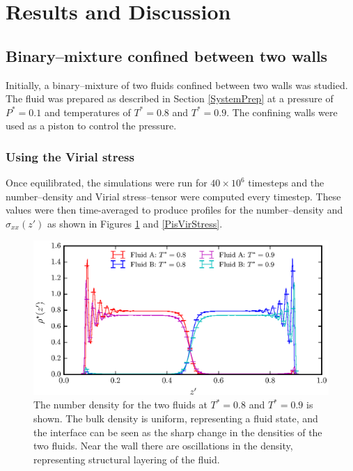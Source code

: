 \section{Results and Discussion}
\subsection{Binary--mixture confined between two walls}\label{Piston}
Initially, a binary--mixture of two fluids confined between two walls was studied. 
The fluid was prepared as described in Section \ref{SystemPrep} at a pressure of $P^{*} = 0.1$ and temperatures of $T^{*} = 0.8$ and $T^{*} = 0.9$.
The confining walls were used as a piston to control the pressure.

\subsubsection{Using the Virial stress}\label{VirialStressPiston}
Once equilibrated, the simulations were run for $40 \times 10^{6}$ timesteps and the number--density and Virial stress--tensor were computed every timestep.
These values were then time-averaged to produce profiles for the number--density and $\sigma_{xx}(z')$ as shown in Figures \ref{PisVirRho} and \ref{PisVirStress}. 

\FloatBarrier
\begin{figure}[h]
\centering
\includegraphics[scale=0.8]{PisVirRho}
\caption{The number density for the two fluids at $T^{*} = 0.8$ and $T^{*} = 0.9$ is shown. 
The bulk density is uniform, representing a fluid state, and the interface can be seen as the sharp change in the densities of the two fluids.
Near the wall there are oscillations in the density, representing structural layering of the fluid.}
\label{PisVirRho}
\end{figure}

